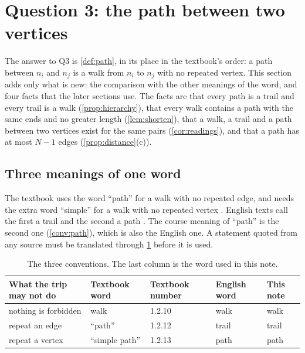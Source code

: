 \section{Question 3: the path between two vertices}\label{sec:paths}

The answer to Q3 is \cref{def:path}, in its place in the textbook's order:
a path between $n_i$ and $n_j$ is a walk from $n_i$ to $n_j$ with no repeated
vertex. This section adds only what is new: the comparison with the other
meanings of the word, and four facts that the later sections use. The facts
are that every path is a trail and every trail is a walk (\cref{prop:hierarchy}),
that every walk contains a path with the same ends and no greater length
(\cref{lem:shorten}), that a walk, a trail and a path between two vertices exist for the same pairs
(\cref{cor:readings}), and that a path has at most $N-1$ edges
(\cref{prop:distance}(c)).

\subsection{Three meanings of one word}

The textbook uses the word ``path'' for a walk with no repeated edge, and
needs the extra word ``simple'' for a walk with no repeated vertex
\cite[Definitions 1.2.12 and 1.2.13, p.~22]{petrosyan2015grafneri}. English
texts call the first a trail and the second a path
\cite{wikipediapathgraphtheory,grinberg2025introduction}. The course meaning
of ``path'' is the second one (\cref{conv:path}), which is also the English
one. A statement quoted from any source must be translated through
\cref{tab:conventions} before it is used.

\begin{table}[ht]
\centering
\caption{The three conventions. The last column is the word used in this note.}
\label{tab:conventions}
\begin{tabular}{lllll}
\toprule
What the trip may not do & Textbook word & Textbook number & English word & This note \\
\midrule
nothing is forbidden & walk & 1.2.10 & walk & walk \\
repeat an edge & ``path'' & 1.2.12 & trail & trail \\
repeat a vertex & ``simple path'' & 1.2.13 & path & path \\
\bottomrule
\end{tabular}
\end{table}

